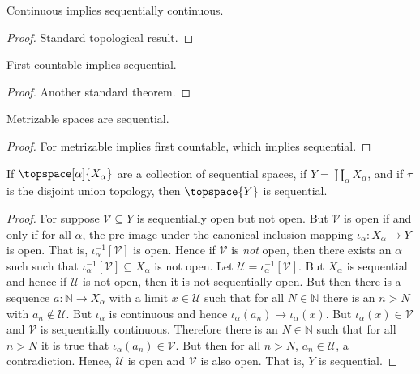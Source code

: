 \documentclass{article}                                                        %
\begin{document}
    \begin{theorem}
        Continuous implies sequentially continuous.
    \end{theorem}
    \begin{proof}
        Standard topological result.
    \end{proof}
    \begin{theorem}
        First countable implies sequential.
    \end{theorem}
    \begin{proof}
        Another standard theorem.
    \end{proof}
    \begin{theorem}
        Metrizable spaces are sequential.
    \end{theorem}
    \begin{proof}
        For metrizable implies first countable, which implies sequential.
    \end{proof}
    \begin{theorem}
        If $\topspace[\alpha]{X_{\alpha}}$ are a collection of sequential
        spaces, if $Y=\coprod_{\alpha}X_{\alpha}$, and if $\tau$ is the
        disjoint union topology, then $\topspace{Y}$ is sequential.
    \end{theorem}
    \begin{proof}
        For suppose $\mathcal{V}\subseteq{Y}$ is sequentially open but not open.
        But $\mathcal{V}$ is open if and only if for all $\alpha$, the pre-image
        under the canonical inclusion mapping
        $\iota_{\alpha}:X_{\alpha}\rightarrow{Y}$ is open. That is,
        $\iota_{\alpha}^{\minus{1}}[\mathcal{V}]$ is open. Hence if
        $\mathcal{V}$ is \textit{not} open, then there exists an $\alpha$ such
        such that $\iota_{\alpha}^{\minus{1}}[\mathcal{V}]\subseteq{X}_{\alpha}$
        is not open. Let $\mathcal{U}=\iota_{\alpha}^{\minus{1}}[\mathcal{V}]$.
        But $X_{\alpha}$ is sequential and hence if $\mathcal{U}$ is not open,
        then it is not sequentially open. But then there is a sequence
        $a:\mathbb{N}\rightarrow{X}_{\alpha}$ with a limit $x\in\mathcal{U}$
        such that for all $N\in\mathbb{N}$ there is an $n>N$ with
        $a_{n}\notin\mathcal{U}$. But $\iota_{\alpha}$ is continuous and hence
        $\iota_{\alpha}(a_{n})\rightarrow\iota_{\alpha}(x)$. But
        $\iota_{\alpha}(x)\in\mathcal{V}$ and $\mathcal{V}$ is sequentially
        continuous. Therefore there is an $N\in\mathbb{N}$ such that for all
        $n>N$ it is true that $\iota_{\alpha}(a_{n})\in\mathcal{V}$. But then
        for all $n>N$, $a_{n}\in\mathcal{U}$, a contradiction. Hence,
        $\mathcal{U}$ is open and $\mathcal{V}$ is also open. That is, $Y$ is
        sequential.
    \end{proof}
\end{document}
